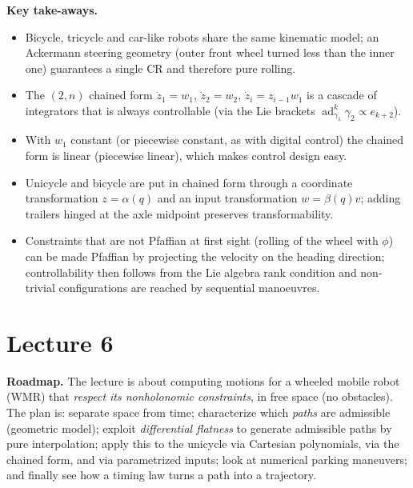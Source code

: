 \documentclass[11pt,a4paper]{article}
\def\bm#1{#1}%
\DeclareMathOperator{\ad}{ad}
\newcommand{\qv}{\bm{q}}
\newcommand{\zv}{\bm{z}}
\newcommand{\wv}{\bm{w}}
\newcommand{\vv}{\bm{v}}
\theoremstyle{definition}
\theoremstyle{plain}
\theoremstyle{remark}
\begin{document}
\textbf{Key take-aways.}
\begin{itemize}
 \item Bicycle, tricycle and car-like robots share the same kinematic model; an Ackermann steering geometry (outer front wheel turned less than the inner one) guarantees a single CR and therefore pure rolling.
 \item The $(2,n)$ chained form $\dot z_1=w_1$, $\dot z_2=w_2$, $\dot z_i=z_{i-1}w_1$ is a cascade of integrators that is always controllable (via the Lie brackets $\ad^k_{\bm\gamma_1}\bm\gamma_2\propto\bm e_{k+2}$).
 \item With $w_1$ constant (or piecewise constant, as with digital control) the chained form is linear (piecewise linear), which makes control design easy.
 \item Unicycle and bicycle are put in chained form through a coordinate transformation $\zv=\bm\alpha(\qv)$ and an input transformation $\wv=\bm\beta(\qv)\vv$; adding trailers hinged at the axle midpoint preserves transformability.
 \item Constraints that are not Pfaffian at first sight (rolling of the wheel with $\phi$) can be made Pfaffian by projecting the velocity on the heading direction; controllability then follows from the Lie algebra rank condition and non-trivial configurations are reached by sequential manoeuvres.
\end{itemize}

\newpage

\setcounter{section}{0}
\renewcommand{\thesection}{\arabic{section}}
\part{Lecture 6}

\noindent\textbf{Roadmap.} The lecture is about computing motions for a wheeled mobile robot (WMR) that
\emph{respect its nonholonomic constraints}, in free space (no obstacles). The plan is:
separate space from time; characterize which \emph{paths} are admissible (geometric model);
exploit \emph{differential flatness} to generate admissible paths by pure interpolation; apply this to the unicycle
via Cartesian polynomials, via the chained form, and via parametrized inputs; look at numerical parking
maneuvers; and finally see how a timing law turns a path into a trajectory.
\end{document}
